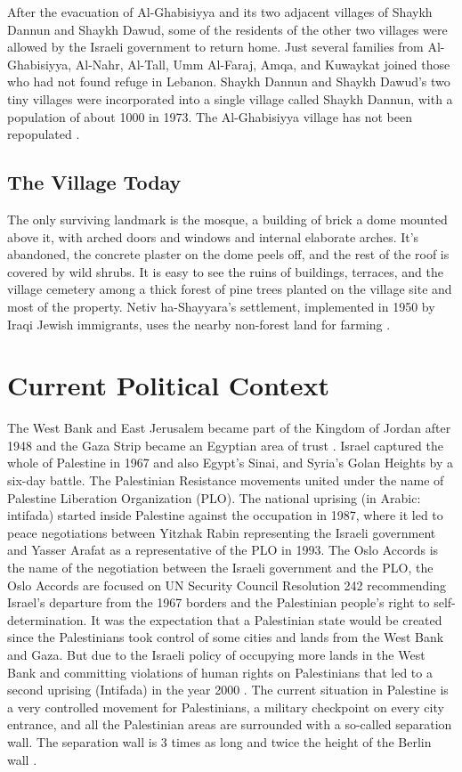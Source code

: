After the evacuation of Al-Ghabisiyya and its two adjacent villages of Shaykh Dannun and Shaykh Dawud, some of the residents of the other two villages were allowed by the Israeli government to return home. Just several families from Al-Ghabisiyya, Al-Nahr, Al-Tall, Umm Al-Faraj, Amqa, and Kuwaykat joined those who had not found refuge in Lebanon. Shaykh Dannun and Shaykh Dawud's two tiny villages were incorporated into a single village called Shaykh Dannun, with a population of about 1000 in 1973. The Al-Ghabisiyya village has not been repopulated \citep{Khalidi2015}.  

\subsection{The Village Today}

The only surviving landmark is the mosque, a building of brick a dome mounted above it, with arched doors and windows and internal elaborate arches. It's abandoned, the concrete plaster on the dome peels off, and the rest of the roof is covered by wild shrubs. It is easy to see the ruins of buildings, terraces, and the village cemetery among a thick forest of pine trees planted on the village site and most of the property. Netiv ha-Shayyara's settlement, implemented in 1950 by Iraqi Jewish immigrants, uses the nearby non-forest land for farming \citep{Khalidi2015}.    
\section{Current Political Context}

The West Bank and East Jerusalem became part of the Kingdom of Jordan after 1948 and the Gaza Strip became an Egyptian area of trust \citep{Houdaille2010}. Israel captured the whole of Palestine in 1967 and also Egypt's Sinai, and Syria's Golan Heights by a six-day battle. The Palestinian Resistance movements united under the name of Palestine Liberation Organization (PLO). The national uprising (in Arabic: intifada) started inside Palestine against the occupation in 1987, where it led to peace negotiations between Yitzhak Rabin representing the Israeli government and Yasser Arafat as a representative of the PLO in 1993. The Oslo Accords is the name of the negotiation between the Israeli government and the PLO, the Oslo Accords are focused on UN Security Council Resolution 242 recommending Israel's departure from the 1967 borders and the Palestinian people's right to self-determination. It was the expectation that a Palestinian state would be created since the Palestinians took control of some cities and lands from the West Bank and Gaza. But due to the Israeli policy of occupying more lands in the West Bank and committing violations of human rights on Palestinians that led to a second uprising (Intifada) in the year 2000 \citep{Shalhoub-Kevorkian2006}. The current situation in Palestine is a very controlled movement for Palestinians, a military checkpoint on every city entrance, and all the Palestinian areas are surrounded with a so-called separation wall. The separation wall is 3 times as long and twice the height of the Berlin wall \citep{Shalhoub-Kevorkian2006}.



